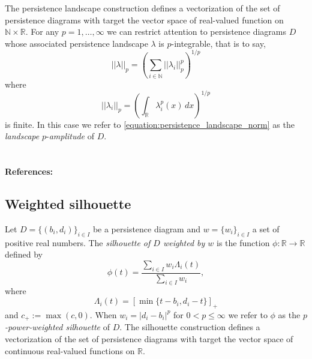 \documentclass{amsart}
\begin{document}
	The persistence landscape construction defines a
	vectorization of the set of persistence diagrams with target the vector space of real-valued function on $\mathbb N \times \mathbb R$. For any $p = 1,\dots,\infty$ we can restrict attention to persistence diagrams $D$ whose associated persistence landscape $\lambda$ is
	$p$-integrable, that is to say,	
	\begin{equation} \label{equation:persistence_landscape_norm}	
	||\lambda||_p = \left( \sum_{i \in \mathbb N} ||\lambda_i||^p_p \right)^{1/p}	
	\end{equation}	
	where
	\begin{equation*}	
	||\lambda_i||_p = \left( \int_{\mathbb R} \lambda_i^p(x)\, dx \right)^{1/p}	
	\end{equation*}	
	is finite. In this case we refer to \eqref{equation:persistence_landscape_norm} as the
	\textit{landscape} $p$-\textit{amplitude} of $D$.

	\paragraph{\\ References:} \cite{bubenik2015statistical}
	
	\subsection*{Weighted silhouette} \label{weighted_silhouette}
	
	Let $D = \{(b_i, d_i)\}_{i \in I}$ be a
	persistence diagram and $w = \{w_i\}_{i \in I}$ a set of positive real numbers. The \textit{silhouette of $D$ weighted by $w$} is the function $\phi : \mathbb R \to \mathbb R$ defined by	
	\begin{equation*}	
	\phi(t) = \frac{\sum_{i \in I}w_i \Lambda_i(t)}{\sum_{i \in I}w_i},	
	\end{equation*}	
	where	
	\begin{equation*}
	\Lambda_i(t) = \left[ \min \{t-b_i, d_i-t\}\right]_+	
	\end{equation*}	
	and $c_+ := \max(c,0)$. When $w_i = \vert d_i - b_i \vert^p$ for $0 < p \leq \infty$ we refer to $\phi$ as the \textit{$p$-power-weighted silhouette} of $D$. The silhouette construction defines a
	vectorization of the set of persistence diagrams with target the vector space of continuous real-valued functions on $\mathbb R$.	
	
\end{document}
